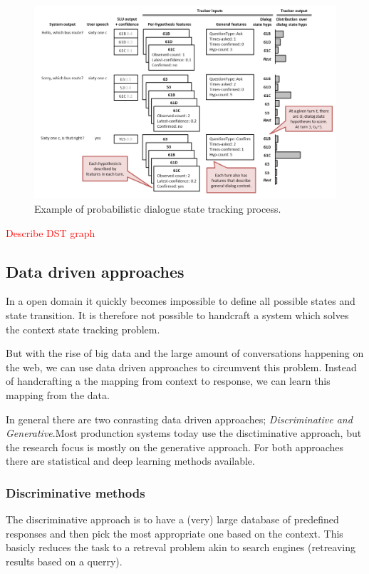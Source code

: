 \documentclass[conference]{IEEEtran}
\newcommand\note[1]{\textcolor{red}{#1}}
\begin{document}
 
\begin{figure}[H]
\centering
   \includegraphics[width=\linewidth]{dstChallangeProbabilistic.jpg}
  \caption{Example of probabilistic dialogue state tracking process\cite{williams2013dialog}.}
  \label{fig:dstChallengeProbabilistic}
\end{figure}

\note{Describe DST graph}

\cite{young2010hidden}\cite{young2013pomdp}
\subsection{Data driven approaches}
In a open domain it quickly becomes impossible to define all possible states and state transition. It is therefore not possible to handcraft a system which solves the context state tracking problem\cite{radlinski2017theoretical}.

But with the rise of big data and the large amount of conversations happening on the web, we can use data driven approaches to circumvent this problem. Instead of handcrafting a the mapping from context to response, we can learn this mapping from the data.

In general there are two conrasting data driven approaches; \emph{Discriminative and Generative}.Most produnction systems today use the disctiminative approach, but the research focus is mostly on the generative approach. For both approaches there are statistical and deep learning methods available\cite{yan2016shall}.

\subsubsection{Discriminative methods}
The discriminative approach is to have a (very) large database of predefined responses and then pick the most appropriate one based on the context. This basicly reduces the task to a retreval problem akin to search engines (retreaving results based on a querry).
\end{document}

